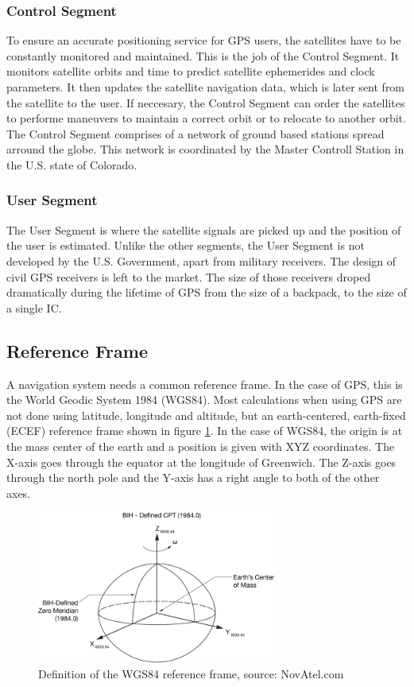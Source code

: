 \subsubsection{Control Segment}

To ensure an accurate positioning service for GPS users, the satellites have to be constantly monitored and maintained.
This is the job of the Control Segment.
It monitors satellite orbits and time to predict satellite ephemerides and clock parameters.
It then updates the satellite navigation data, which is later sent from the satellite to the user.
If neccesary, the Control Segment can order the satellites to performe maneuvers to maintain a correct orbit or to relocate to another orbit.
The Control Segment comprises of a network of ground based stations spread arround the globe.
This network is coordinated by the Master Controll Station in the U.S. state of Colorado.

\subsubsection{User Segment}

The User Segment is where the satellite signals are picked up and the position of the user is estimated.
Unlike the other segments, the User Segment is not developed by the U.S. Government, apart from military receivers.
The design of civil GPS receivers is left to the market.
The size of those receivers droped dramatically during the lifetime of GPS from the size of a backpack, to the size of a single IC.

\subsection{Reference Frame}

A navigation system needs a common reference frame.
In the case of GPS, this is the World Geodic System 1984 (WGS84).
Most calculations when using GPS are not done using latitude, longitude and altitude, but an earth-centered, earth-fixed (ECEF) reference frame shown in figure \ref{fig:wgs84}.
In the case of WGS84, the origin is at the mass center of the earth and a position is given with XYZ coordinates.
The X-axis goes through the equator at the longitude of Greenwich.
The Z-axis goes through the north pole and the Y-axis has a right angle to both of the other axes.

\begin{figure}[ht]
 \centering
 \includegraphics[width=0.7\textwidth]{images/WGS84.png}
 \caption{Definition of the WGS84 reference frame, source: NovAtel.com}
 \label{fig:wgs84}
\end{figure}


